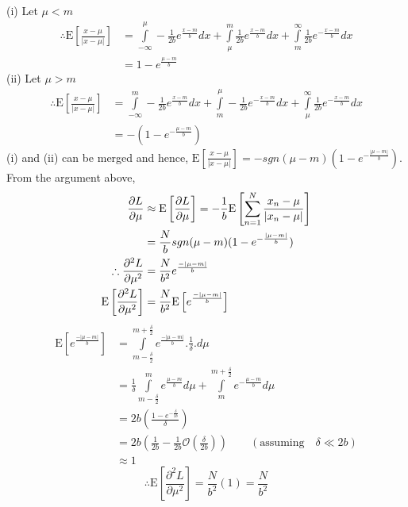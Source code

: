 \documentclass[wcp]{jmlr}
\begin{document}
(i) Let $\mu < m$
\begin{align*}
 \therefore \mathrm{E}\left[\frac{x-\mu}{|x-\mu|}\right] &= \int\limits_{-\infty}^{\mu} -\frac{1}{2b} e^{\frac{x-m}{b}} dx + \int\limits_{\mu}^{m} \frac{1}{2b} e^{\frac{x-m}{b}} dx + \int\limits_{m}^{\infty} \frac{1}{2b} e^{-\frac{x-m}{b}} dx \\
 &= 1 - e^{\frac{\mu-m}{b}}
\end{align*}
(ii) Let $\mu > m$
\begin{align*}
 \therefore \mathrm{E}\left[\frac{x-\mu}{|x-\mu|}\right] &= \int\limits_{-\infty}^{m} -\frac{1}{2b} e^{\frac{x-m}{b}} dx + \int\limits_{m}^{\mu} -\frac{1}{2b} e^{-\frac{x-m}{b}} dx + \int\limits_{\mu}^{\infty} \frac{1}{2b} e^{-\frac{x-m}{b}} dx \\
 &= -(1 - e^{-\frac{\mu-m}{b}})
\end{align*}
(i) and (ii) can be merged and hence, $\mathrm{E}\left[\frac{x-\mu}{|x-\mu|}\right] = - sgn(\mu-m) (1 - e^{-\frac{|\mu-m|}{b}})$. From the argument above,
\begin{align}
 \frac{\partial L}{\partial \mu} &\approx \mathrm{E}\left[\frac{\partial L}{\partial \mu}\right] = -\frac{1}{b} \mathrm{E}\left[\sum_{n=1}^{N}\frac{x_n-\mu}{|x_n-\mu|}\right]\notag\\
 &= \frac{N}{b} sgn(\mu-m) (1 - e^{-\frac{|\mu-m|}{b}}) \label{eqn:laplace_expected_approx}\\
 \therefore \frac{\partial^2 L}{\partial \mu^2} &= \frac{N}{b^2} e^{\frac{-|\mu-m|}{b}} \notag\\
 \mathrm{E} \left[\frac{\partial^2 L}{\partial \mu^2}\right] &= \frac{N}{b^2} \mathrm{E}\left[e^{\frac{-|\mu-m|}{b}}\right] \notag
\end{align}
\begin{align*}
 \mathrm{E}\left[e^{\frac{-|\mu-m|}{b}}\right] &= \int\limits_{m-\frac{\delta}{2}}^{m+\frac{\delta}{2}} e^{\frac{-|\mu-m|}{b}} . \frac{1}{\delta} . d\mu \\
 &= \frac{1}{\delta} \int\limits_{m-\frac{\delta}{2}}^{m} e^{\frac{\mu-m}{b}} d\mu + \int\limits_{m}^{m+\frac{\delta}{2}}e^{-\frac{\mu-m}{b}} d\mu \\
 &= 2b \left(\frac{1-e^{-\frac{\delta}{2b}}}{\delta}\right) \\
 &= 2b \left( \frac{1}{2b} - \frac{1}{2b}\mathcal{O}\left(\frac{\delta}{2b}\right) \right) \quad\quad(\mathrm{assuming} \quad \delta \ll 2b) \\
 &\approx 1
 \end{align*}
\begin{equation*}
 \therefore \mathrm{E} \left[\frac{\partial^2 L}{\partial \mu^2}\right] = \frac{N}{b^2} (1) = \frac{N}{b^2}
\end{equation*}
\end{document}
